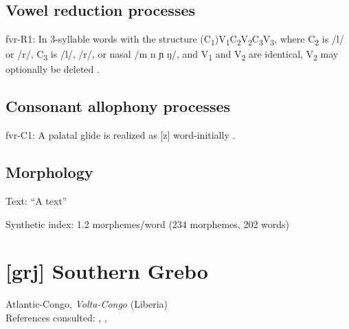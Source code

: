 {\subsection*{Vowel reduction processes}
\begin{appendixdesc}

\item[fvr-R1:] In 3-syllable words with the structure (C\textsubscript{1})V\textsubscript{1}C\textsubscript{2}V\textsubscript{2}C\textsubscript{3}V\textsubscript{3}, where C\textsubscript{2} is /l/ or /r/, C\textsubscript{3} is /l/, /r/, or nasal /m n ɲ ŋ/, and V\textsubscript{1} and V\textsubscript{2} are identical, V\textsubscript{2} may optionally be deleted \citep[60--61]{Jakobi1990}.
\end{appendixdesc}
\subsection*{Consonant allophony processes}
\begin{appendixdesc}

\item[fvr-C1:] A palatal glide is realized as [z] word-initially \citep[19]{Jakobi1990}.
\end{appendixdesc}
\subsection*{Morphology}

\begin{appendixdesc}

\item[Text:] “A  text” \citep[125--127]{Jakobi1990}

\item[Synthetic index:] 1.2 morphemes/word (234 morphemes, 202 words)
\end{appendixdesc}
\section*{[grj] Southern Grebo}  %
Atlantic-Congo, \textit{Volta-Congo} (Liberia)\medskip\\
References consulted: \citet{Innes1966}, \citet{Innes1981}, \citet{Newman1986}

}
